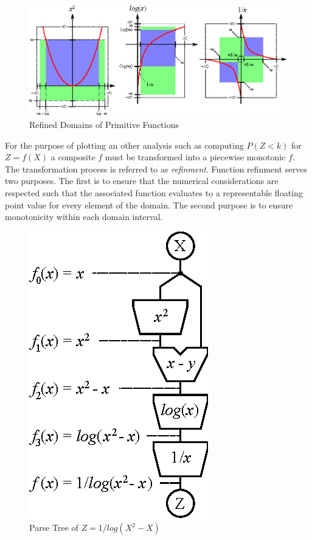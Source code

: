 \begin{figure}
  \centering
  \includegraphics{Images/ExampleDomains.eps}
  \caption[Refined Domains of Primitive Functions]
          {Refined Domains of Primitive Functions}
  \label{fig:ExampleDomains}
\end{figure}

For the purpose of plotting an other analysis such as computing $P(Z < k)$ for $Z = f(X)$ a composite $f$ must be transformed into a piecewise monotonic $f$. The transformation process is referred to as \emph{refinment}. Function refinment serves two purposes. The first is to ensure that the numerical considerations are respected such that the associated function evaluates to a representable floating point value for every element of the domain. The second purpose is to ensure monotonicity within each domain interval.

\begin{figure}
  \centering
  \includegraphics{Images/invlogX2minusXflow.eps}
  \caption[Parse Tree of $Z = 1/log(X^2 - X)$]
          {Parse Tree of $Z = 1/log(X^2 - X)$}
  \label{fig:invlogX2minusXflow}
\end{figure}

